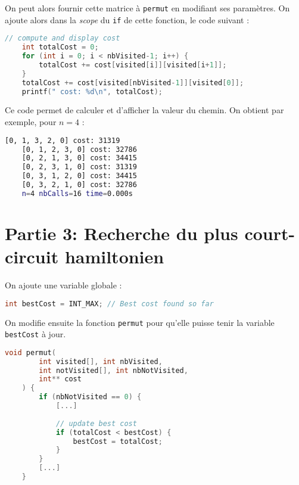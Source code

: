 On peut alors fournir cette matrice à \texttt{permut} en modifiant ses paramètres. On ajoute alors dans la \textit{scope} du \texttt{if} de cette fonction, le code suivant :

\begin{lstlisting}[language=c, caption={Ajout de la matrice des coûts dans la fonction \texttt{permut}}]
    // compute and display cost
    int totalCost = 0;
    for (int i = 0; i < nbVisited-1; i++) {
        totalCost += cost[visited[i]][visited[i+1]];
    }
    totalCost += cost[visited[nbVisited-1]][visited[0]];
    printf(" cost: %d\n", totalCost);
\end{lstlisting}

Ce code permet de calculer et d'afficher la valeur du chemin. On obtient par exemple, pour $n = 4$ :

\begin{lstlisting}[language=bash, caption={Exécution de l'algorithme \texttt{permut} pour $n = 4$ avec calcul de la longueur}]
    [0, 1, 3, 2, 0] cost: 31319
    [0, 1, 2, 3, 0] cost: 32786
    [0, 2, 1, 3, 0] cost: 34415
    [0, 2, 3, 1, 0] cost: 31319
    [0, 3, 1, 2, 0] cost: 34415
    [0, 3, 2, 1, 0] cost: 32786
    n=4 nbCalls=16 time=0.000s
\end{lstlisting}

\section{Partie 3: Recherche du plus court-circuit hamiltonien}

On ajoute une variable globale :

\begin{lstlisting}[language=c, caption={Ajout d'une variable globale pour stocker le coût minimum}]
    int bestCost = INT_MAX; // Best cost found so far
\end{lstlisting}

On modifie ensuite la fonction \texttt{permut} pour qu'elle puisse tenir la variable \texttt{bestCost} à jour.

\begin{lstlisting}[language=c, caption={Mise à jour de la variable \texttt{bestCost} dans la fonction \texttt{permut}}]
    void permut(
        int visited[], int nbVisited, 
        int notVisited[], int nbNotVisited,
        int** cost
    ) {
        if (nbNotVisited == 0) {
            [...]
    
            // update best cost
            if (totalCost < bestCost) {
                bestCost = totalCost;
            }
        }
        [...]
    }
\end{lstlisting}

